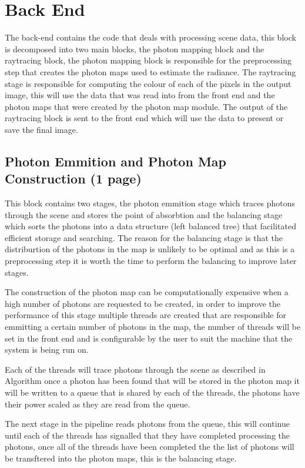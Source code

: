 \section{Back End}
The back-end contains the code that deals with processing scene data, this block is decomposed into
two main blocks, the photon mapping block and the raytracing block, the photon mapping block is responsible
for the preprocessing step that creates the photon maps used to estimate the radiance. The raytracing stage
is responsible for computing the colour of each of the pixels in the output image, this will use the data
that was read into from the front end and the photon maps that were created by the photon map module. The
output of the raytracing block is sent to the front end which will use the data to present or save the final
image.

\subsection{Photon Emmition and Photon Map Construction (1 page)}
This block contains two stages, the photon emmition stage which traces photons through the scene and stores
the point of absorbtion and the balancing stage which sorts the photons into a data structure (left balanced
tree) that facilitated efficient storage and searching. The reason for the balancing stage is that the
distriburtion of the photons in the map is unlikely to be optimal  and as this is a
preprocessing step it is worth the time to perform the balancing to improve later stages.

The construction of the photon map can be computationally expensive when a high number of photons are
requested to be created, in order to improve the performance of this stage multiple threads are created
that are responsible for emmitting a certain number of photons in the map, the number of threads will be
set in the front end and is configurable by the user to suit the machine that the system is being run on.

Each of the threads will trace photons through the scene as described in Algorithm
once a photon has been found that will be stored in the photon map it will be written to a queue that is shared
by each of the threads, the photons have their power scaled as they are read from the queue.

The next stage in the pipeline reads photons from the queue, this will continue until each of the threads
has signalled that they have completed processing the photons, once all of the threads have been completed the
the list of photons will be transftered into the photon maps, this is the balancing stage.

